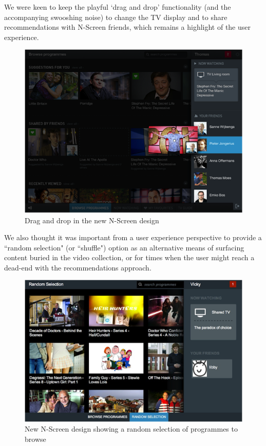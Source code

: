 \documentclass{notube}
\begin{document}
We were keen to keep the playful `drag and drop' functionality (and the accompanying swooshing noise) to change the TV display and to share recommendations with N-Screen friends, which remains a highlight of the user experience. 

\begin{figure}[htbp]
\begin{center}
\includegraphics[width=6in]{images/dd.png}
\caption{Drag and drop in the new N-Screen design} \label{fig:dd}
\end{center}
\end{figure}

We also thought it was important from a user experience perspective to provide a ``random selection" (or ``shuffle") option as an alternative means of surfacing content buried in the video collection, or for times when the user might reach a dead-end with the recommendations approach. 

\begin{figure}[htbp]
\begin{center}
\includegraphics[width=6in]{images/random.png}
\caption{New N-Screen design showing a random selection of programmes to browse} \label{fig:random}
\end{center}
\end{figure}
\end{document}
